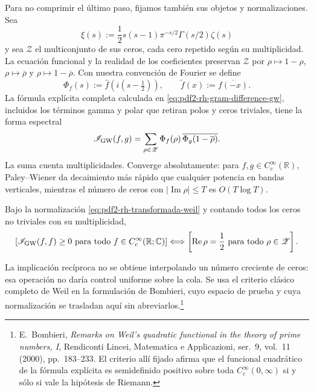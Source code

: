 Para no comprimir el último paso, fijamos también sus objetos y
normalizaciones. Sea
\[
 \xi(s):=\frac12s(s-1)\pi^{-s/2}\Gamma(s/2)\zeta(s)
\]
y sea \(\mathscr Z\) el multiconjunto de sus ceros, cada cero repetido según
su multiplicidad. La ecuación funcional y la realidad de los coeficientes
preservan \(\mathscr Z\) por
\(\rho\mapsto1-\rho\), \(\rho\mapsto\overline\rho\) y
\(\rho\mapsto1-\overline\rho\). Con nuestra convención de Fourier se define
\begin{equation}\label{eq:pdf2-rh-transformada-weil}
 \Phi_f(s):=\widehat f\!\left(i(s-\tfrac12)\right),
 \qquad
 \widetilde f(x):=\overline{f(-x)}.
\end{equation}
La fórmula explícita completa calculada en
\eqref{eq:pdf2-rh-gram-difference-gw}, incluidos los términos gamma y polar
que retiran polos y ceros triviales, tiene la forma espectral
\begin{equation}\label{eq:pdf2-rh-formula-espectral-weil}
 \mathscr I_{\rm GW}(f,g)
 =\sum_{\rho\in\mathscr Z}
   \Phi_f(\rho)\,
   \overline{\Phi_g(1-\overline\rho)}.
\end{equation}
La suma cuenta multiplicidades. Converge absolutamente: para
\(f,g\in C_c^\infty(\mathbb R)\), Paley--Wiener da decaimiento más rápido
que cualquier potencia en bandas verticales, mientras el número de ceros con
\(|\operatorname{Im}\rho|\leq T\) es \(O(T\log T)\).

\begin{proposition}
\label{prop:pdf2-rh-criterio-weil-desplegado}
Bajo la normalización
\eqref{eq:pdf2-rh-transformada-weil} y contando todos los ceros no triviales
con su multiplicidad,
\begin{equation}\label{eq:pdf2-rh-criterio-weil}
 \left[
  \mathscr I_{\rm GW}(f,f)\geq0
  \text{ para todo }f\in C_c^\infty(\mathbb R;\mathbb C)
 \right]
 \Longleftrightarrow
 \left[
  \operatorname{Re}\rho=\frac12
  \text{ para todo }\rho\in\mathscr Z
 \right].
\end{equation}
\end{proposition}

La implicación recíproca no se obtiene interpolando un número creciente de
ceros: esa operación no daría control uniforme sobre la cola. Se usa el
criterio clásico completo de Weil en la formulación de Bombieri, cuyo espacio
de prueba y cuya normalización se trasladan aquí sin abreviarlos.\footnote{%
E.~Bombieri, \emph{Remarks on Weil's quadratic functional in the theory of
prime numbers, I}, Rendiconti Lincei, Matematica e Applicazioni, ser.~9,
vol.~11 (2000), pp.~183--233. El criterio allí fijado afirma que el funcional
cuadrático de la fórmula explícita es semidefinido positivo sobre toda
\(C_c^\infty(0,\infty)\) si y sólo si vale la hipótesis de Riemann.}

